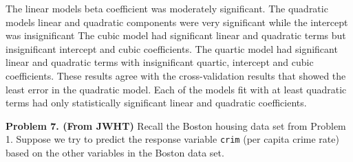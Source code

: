 \documentclass[11pt]{report}
\begin{document}
The linear models beta coefficient was moderately significant.
The quadratic models linear and quadratic components were very significant while the intercept was insignificant
The cubic model had significant linear and quadratic terms but insignificant intercept and cubic coefficients.
The quartic model had significant linear and quadratic terms with insignificant quartic, intercept and cubic coefficients.
These results agree with the cross-validation results that showed the least error in the quadratic model. Each of the models fit with at least quadratic terms had only statistically significant  linear and quadratic coefficients. 

\newpage
\noindent
{\bf Problem 7. (From JWHT)} Recall the Boston housing data set from Problem 1. Suppose we try to predict the response variable {\tt crim} (per capita crime rate) based on the other variables in the Boston data set.
\end{document}
